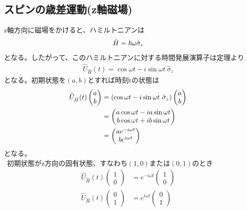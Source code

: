 \documentclass{jsarticle}  %
\numberwithin{equation}{section} %
\numberwithin{figure}{section}
\begin{document}
\subsection{スピンの歳差運動(z軸磁場)}
    z軸方向に磁場をかけると、ハミルトニアンは
    \begin{align}
        \hat{H} &= \hbar \omega \hat{\sigma}_z \notag \\
    \end{align}
    となる。したがって、このハミルトニアンに対する時間発展演算子は定理より
    \begin{align}
        \hat{U}_{\hat{H}}(t) = \cos \omega t - i\sin \omega t\ \hat{\sigma}_z
    \end{align}
    となる。初期状態を$(a,b)$とすれば時刻tの状態は
    \begin{align}
        \hat{U}_{\hat{H}}(t) 
        \left(
        \begin{matrix}
            a\\
            b
        \end{matrix}
        \right) &= \left( \cos \omega t - i\sin \omega t\ \hat{\sigma}_z \right)
        \left(
        \begin{matrix}
            a\\
            b
        \end{matrix}
        \right) \\
        &=
        \left(
        \begin{matrix}
            a\cos \omega t - ia\sin \omega t\\
            b\cos \omega t + ib\sin \omega t
        \end{matrix}
        \right)\notag \\
        &=
        \left(
        \begin{matrix}
            ae^{-i\omega t}\\
            be^{i\omega t}
        \end{matrix}
        \right) 
    \end{align}
    となる。\\
    $\ \ $初期状態がz方向の固有状態、すなわち$(1,0)$または$(0,1)$のとき
    \begin{align}
        \hat{U}_{\hat{H}}(t) 
        \left(
        \begin{matrix}
            1\\
            0
        \end{matrix}
        \right) &= e^{-i\omega t}
        \left(
        \begin{matrix}
            1\\
            0
        \end{matrix}
        \right)  \\
        \hat{U}_{\hat{H}}(t) 
        \left(
        \begin{matrix}
            0\\
            1
        \end{matrix}
        \right) &= e^{i\omega t}
        \left(
        \begin{matrix}
            0\\
            1
        \end{matrix}
        \right) 
    \end{align}
\end{document}
